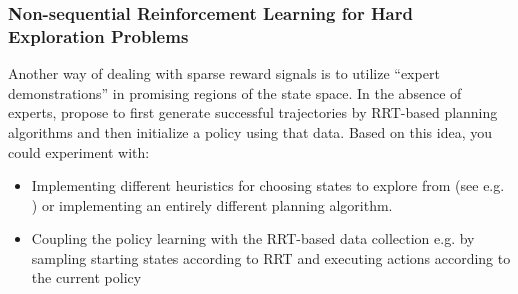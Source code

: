 \documentclass[a4paper]{article}
\begin{document}
\subsubsection{Non-sequential Reinforcement Learning for Hard Exploration Problems}
Another way of dealing with sparse reward signals is to utilize ``expert demonstrations'' in promising regions of the state space. In the absence of experts, \cite{blau2021learning} propose to first generate successful trajectories by RRT-based planning algorithms and then initialize a policy using that data. Based on this idea, you could experiment with:
\begin{itemize}
   \item Implementing different heuristics for choosing states to explore from (see e.g. \cite{ecoffet2019go}) or implementing an entirely different planning algorithm.
  \item Coupling the policy learning with the RRT-based data collection e.g. by sampling starting states according to RRT and executing actions according to the current policy
\end{itemize}


%
\end{document}
